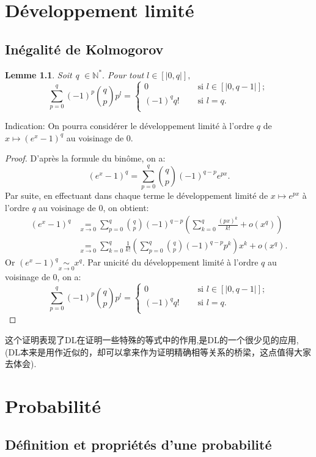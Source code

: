 \documentclass[12pt]{book}
\theoremstyle{definition}\newtheorem{dfn}{Définition}[chapter]
\theoremstyle{plain}\newtheorem{thm}{Théorème}[chapter]
\theoremstyle{plain}\newtheorem{prp}{Proposition}[chapter]
\theoremstyle{plain}\newtheorem{lem}{\bf Lemme}[chapter]
\theoremstyle{plain}\newtheorem{axm}{\bf Axiome}[chapter]
\theoremstyle{plain}\newtheorem{lmm}{\bf Lemme}[chapter]
\theoremstyle{plain}\newtheorem{cor}{\bf Corollaire}[chapter]
\theoremstyle{remark}\newtheorem{rem}{Remarque}[chapter]
\begin{document}
\chapter{Développement limité }
\section{Inégalité de Kolmogorov}
\begin{lem}
 Soit q $\in \mathbb N^*.$ Pour tout $l\in [|0,q|],$
$$\sum_{p=0}^q(-1)^p\binom{q}{p}p^l=\left\{
\begin{aligned}
0&\quad\text{ si }l\in [|0,q-1|];\\
(-1)^qq!&\quad\text{ si }l=q.\\
\end{aligned}\right.$$
\end{lem}

Indication: On pourra considérer le développement limité à l'ordre $q$ de $x\longmapsto (e^x-1)^q$ au voisinage de 0.
\begin{proof}
 D'après la formule du binôme, on a: 
$$(e^x-1)^q=\sum^q_{p=0}\binom{q}{p}(-1)^{q-p}e^{px}.$$
Par suite, en effectuant dans chaque terme le développement limité de $x\longmapsto e^{px}$ à l'ordre $q$ au voisinage de 0, on obtient:
$$\begin{aligned}
(e^x-1)^q&\underset{x\to 0}=\sum^q_{p=0}\binom{q}{p}(-1)^{q-p}\left(\sum^q_{k=0}\frac{(px)^k}{k!}+o(x^q)\right)\\
&\underset{x\to 0}=\sum^q_{k=0}\frac{1}{k!}\left(\sum^q_{p=0}\binom{q}{p}(-1)^{q-p}p^k\right)x^k+o(x^q).
\end{aligned}$$
Or $(e^x-1)^q\underset{x\to 0}\sim x^q$. Par  unicité du développement limité à l'ordre $q$ au voisinage de 0, on a: $$\sum_{p=0}^q(-1)^p\binom{q}{p}p^l=\left\{
\begin{aligned}
0&\quad\text{ si }l\in [|0,q-1|];\\
(-1)^qq!&\quad\text{ si }l=q.\\
\end{aligned}\right.$$ 
\end{proof}

这个证明表现了DL在证明一些特殊的等式中的作用,是DL的一个很少见的应用,(DL本来是用作近似的，却可以拿来作为证明精确相等关系的桥梁，这点值得大家去体会).


\chapter{Probabilité}
\section{Définition et propriétés d'une probabilité }%
\end{document}
